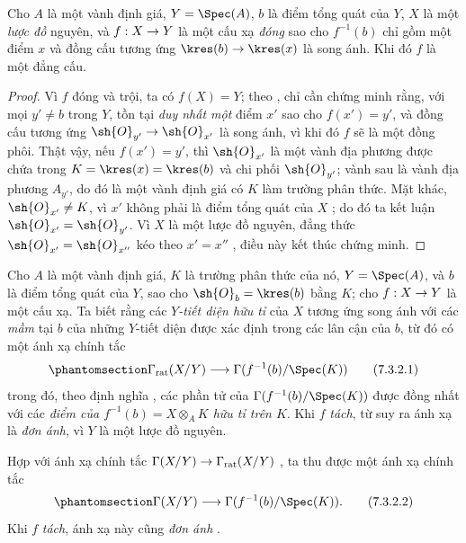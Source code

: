 \documentclass[oneside,10pt]{amsart}
\makeatletter
\newcommand{\ega@arrow}[2]{\mathchoice{#1}{#2}{#2}{#2}}
\renewcommand{\to}{\ega@arrow{\longrightarrow}{\rightarrow}}
\let\EGAOriginalLabel\label
\renewcommand{\label}[1]{\phantomsection\EGAOriginalLabel{#1}}
\makeatother
\begin{document}
\begin{proposition}[7.3.1]
\label{II.7.3.1}
Cho $A$ là một vành định giá, $Y=\Spec(A)$, $b$ là điểm tổng quát của $Y$, $X$ là một \emph{lược đồ} nguyên, và $f:X\to Y$ là một cấu xạ \emph{đóng} sao cho $f^{-1}(b)$ chỉ gồm một điểm $x$ và đồng cấu tương ứng $\kres(b)\to\kres(x)$ là song ánh.
Khi đó $f$ là một đẳng cấu.
\end{proposition}

\begin{proof}
Vì $f$ đóng và trội, ta có $f(X)=Y$;
theo , chỉ cần chứng minh rằng, với mọi $y'\neq b$ trong $Y$, tồn tại \emph{duy nhất một} điểm $x'$ sao cho $f(x')=y'$, và đồng cấu tương ứng $\sh{O}_{y'}\to\sh{O}_{x'}$ là song ánh, vì khi đó $f$ sẽ là một đồng phôi.
Thật vậy, nếu $f(x')=y'$, thì $\sh{O}_{x'}$ là một vành địa phương được chứa trong $K=\kres(x)=\kres(b)$ và chi phối $\sh{O}_{y'}$;
vành sau là vành địa phương $A_{y'}$, do đó là một vành định giá  có $K$ làm trường phân thức.
Mặt khác, $\sh{O}_{x'}\neq K$, vì $x'$ không phải là điểm tổng quát của $X$ ;
do đó ta kết luận $\sh{O}_{x'}=\sh{O}_{y'}$.
Vì $X$ là một lược đồ nguyên, đẳng thức $\sh{O}_{x'}=\sh{O}_{x''}$ kéo theo $x'=x''$ , điều này kết thúc chứng minh.
\end{proof}

\begin{env}[7.3.2]
\label{II.7.3.2}
Cho $A$ là một vành định giá, $K$ là trường phân thức của nó, $Y=\Spec(A)$, và $b$ là điểm tổng quát của $Y$, sao cho $\sh{O}_b=\kres(b)$ bằng $K$;
cho $f:X\to Y$ là một cấu xạ.
Ta biết  rằng các \emph{$Y$-tiết diện hữu tỉ} của $X$ tương ứng song ánh với các \emph{mầm} tại $b$ của những $Y$-tiết diện được xác định trong các lân cận của $b$, từ đó có một ánh xạ chính tắc
\[
\label{II.7.3.2.1}
    \Gamma_\mathrm{rat}(X/Y) \to \Gamma(f^{-1}(b)/\Spec(K))
\tag{7.3.2.1}
\]
trong đó, theo định nghĩa , các phần tử của $\Gamma(f^{-1}(b)/\Spec(K))$ được đồng nhất với các \emph{điểm của $f^{-1}(b)=X\otimes_A K$ hữu tỉ trên $K$}.
Khi $f$ \emph{tách}, từ  suy ra ánh xạ  là \emph{đơn ánh}, vì $Y$ là một lược đồ nguyên.

Hợp  với ánh xạ chính tắc $\Gamma(X/Y)\to\Gamma_\mathrm{rat}(X/Y)$ , ta thu được một ánh xạ chính tắc
\[
\label{II.7.3.2.2}
    \Gamma(X/Y) \to \Gamma(f^{-1}(b)/\Spec(K)).
\tag{7.3.2.2}
\]
Khi $f$ \emph{tách}, ánh xạ này cũng \emph{đơn ánh} .
\end{env}
\end{document}
